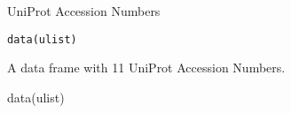 \begin{Description} UniProt Accession Numbers
\end{Description}
\begin{Usage}
\begin{verbatim}data(ulist)\end{verbatim}
\end{Usage}
\begin{Format}\relax
A data frame with 11 UniProt Accession Numbers.
\end{Format}
\begin{Examples}
\begin{ExampleCode}
data(ulist)

\end{ExampleCode}
\end{Examples}

